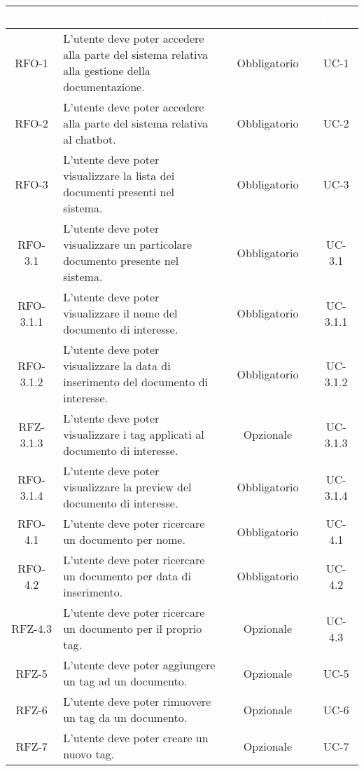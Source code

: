 \begingroup
\setlength{\tabcolsep}{10pt}
\renewcommand{\arraystretch}{1.5}
\begin{xltabular}{\textwidth}{| c | X | c | c |}
    \hline
     \textbf{\textcolor{white}{Codice}} & \textbf{\textcolor{white}{Descrizione}} & \textbf{\textcolor{white}{Classificazione}} & \textbf{\textcolor{white}{Fonte}}\\
    \hline
    \endhead
    RFO-1 & L’utente deve poter accedere alla parte del sistema relativa alla gestione della documentazione. & Obbligatorio & UC-1 \\
    \hline
    RFO-2 & L’utente deve poter accedere alla parte del sistema relativa al chatbot. & Obbligatorio & UC-2 \\
    \hline
    RFO-3 & L’utente deve poter visualizzare la lista dei documenti presenti nel sistema. & Obbligatorio & UC-3 \\
    \hline
    RFO-3.1 & L’utente deve poter visualizzare un particolare documento presente nel sistema. & Obbligatorio & UC-3.1 \\
    \hline
    RFO-3.1.1 & L'utente deve poter visualizzare il nome del documento di interesse. & Obbligatorio & UC-3.1.1 \\
    \hline
    RFO-3.1.2 & L’utente deve poter visualizzare la data di inserimento del documento di interesse. & Obbligatorio & UC-3.1.2 \\
    \hline
    RFZ-3.1.3 & L’utente deve poter visualizzare i tag applicati al documento di interesse. & Opzionale & UC-3.1.3 \\
    \hline
    RFO-3.1.4 & L’utente deve poter visualizzare la preview del documento di interesse. & Obbligatorio & UC-3.1.4 \\
    \hline
    RFO-4.1 & L’utente deve poter ricercare un documento per nome. & Obbligatorio & UC-4.1 \\
    \hline
    RFO-4.2 & L’utente deve poter ricercare un documento per data di inserimento. & Obbligatorio & UC-4.2 \\
    \hline
    RFZ-4.3 & L’utente deve poter ricercare un documento per il proprio tag. & Opzionale & UC-4.3 \\
    \hline
    RFZ-5 & L’utente deve poter aggiungere un tag ad un documento. & Opzionale & UC-5 \\
    \hline
    RFZ-6 & L’utente deve poter rimuovere un tag da un documento. & Opzionale & UC-6 \\
    \hline
    RFZ-7 & L’utente deve poter creare un nuovo tag. & Opzionale & UC-7 \\

\end{xltabular}
